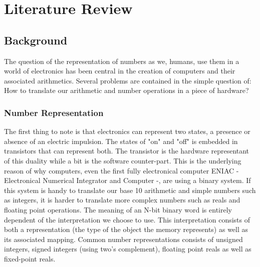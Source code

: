 \chapter{Literature Review} %

\label{Chapter2} %



\section{Background}

The question of the representation of numbers as we, humans, use them in a world of electronics has been central in the creation of computers and their associated arithmetics. Several problems are contained in the simple question of: How to translate our arithmetic and number operations in a piece of hardware?

\subsection{Number Representation}

The first thing to note is that electronics can represent two states, a presence or absence of an electric impulsion. The states of "on" and "off" is embedded in transistors that can represent both. The transistor is the hardware representant of this duality while a bit is the software counter-part. This is the underlying reason of why computers, even the first fully electronical computer ENIAC - Electronical Numerical Integrator and Computer -, are using a binary system. If this system is handy to translate our base 10 arithmetic and simple numbers such as integers, it is harder to translate more complex numbers such as reals and floating point operations. The meaning of an N-bit binary word is entirely dependent of the interpretation we choose to use. This interpretation consists of both a representation (the type of the object the memory represents) as well as its associated mapping. Common number representations consists of unsigned integers, signed integers (using two's complement), floating point reals as well as fixed-point reals.

